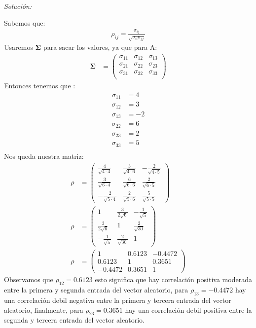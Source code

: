 \documentclass[12pt]{article}
\newenvironment{sol}
    {\emph{Solución:}
    }
    {
    }
\begin{document}
\begin{sol}
Sabemos que:
\begin{align*}
\rho_{ij} = \frac{\sigma_{ij}}{\sqrt{\sigma_{ii}\sigma_{jj}}}
\end{align*}
Usaremos $\mathbf{\Sigma}$ para sacar los valores, ya que para A:
\begin{align*}
\mathbf{\Sigma} &= 
\begin{pmatrix}
\sigma_{11} & \sigma_{12} & \sigma_{13} \\ 
\sigma_{21} & \sigma_{22} & \sigma_{23} \\ 
\sigma_{31} & \sigma_{32} & \sigma_{33} \\ 
\end{pmatrix}
\end{align*}
Entonces tenemos que :
\begin{align*}
\sigma_{11} &= 4\\
\sigma_{12} &= 3\\
\sigma_{13} &= -2\\
\sigma_{22} &= 6\\
\sigma_{23} &= 2\\
\sigma_{33} &= 5\\
\end{align*}
Nos queda nuestra matriz:
\begin{align*}
\rho &= \begin{pmatrix}
\frac{4}{\sqrt{4\cdot 4}} & \frac{3}{\sqrt{4 \cdot 6}} & -\frac{2}{\sqrt{4 \cdot 5}} \\
\frac{3}{\sqrt{6 \cdot 4}} & \frac{6}{\sqrt{6\cdot 6}} & \frac{2}{\sqrt{6 \cdot 5}} \\
-\frac{2}{\sqrt{5 \cdot 4}} & \frac{2}{\sqrt{5 \cdot 6}} & \frac{5}{\sqrt{5\cdot 5}}
\end{pmatrix}\\
\rho &= \begin{pmatrix}
1 & \frac{3}{2\sqrt{6}} & -\frac{1}{\sqrt{5}} \\
\frac{3}{2\sqrt{6}} & 1 & \frac{2}{\sqrt{30}} \\
-\frac{1}{\sqrt{5}} & \frac{2}{\sqrt{30}} & 1
\end{pmatrix}\\
\rho &= 
\begin{pmatrix}
1 & 0.6123 & -0.4472 \\
0.6123 & 1 & 0.3651 \\
-0.4472 &  0.3651 & 1
\end{pmatrix}
\end{align*}
Observamos que $\rho_{12} = 0.6123$ esto significa que hay correlación positiva moderada entre la primera y segunda entrada del vector aleatorio, para $\rho_{13} = -0.4472$ hay una correlación debil negativa entre la primera y tercera entrada del vector aleatorio, finalmente, para $\rho_{23} = 0.3651$ hay una correlación debil positiva entre la segunda y tercera entrada del vector aleatorio.\\\\

\end{sol}
\end{document}
